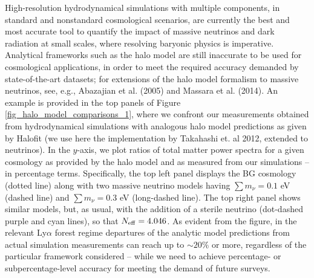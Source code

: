 \documentclass{emulateapj}
\begin{document}
High-resolution hydrodynamical simulations with multiple components,  in standard and nonstandard cosmological scenarios,  
are currently  the best and most accurate tool to quantify the impact of massive neutrinos and dark radiation at small scales, where
resolving baryonic physics is imperative. Analytical frameworks such as the halo model  are still
 inaccurate to be used for cosmological applications, in order to meet
the required accuracy demanded by state-of-the-art datasets; for extensions of the halo model formalism to massive neutrinos, see, e.g., Abazajian et al. (2005) and Massara et al. (2014). 
An example is provided in the top panels of Figure \ref{fig_halo_model_comparisons_1},
where we confront our measurements obtained from hydrodynamical simulations with
analogous halo model predictions as given by Halofit (we use here the implementation by Takahashi et. al 2012, extended to neutrinos).
In the $y$-axis, we  plot ratios of total matter power spectra for a given cosmology as provided by the halo model 
and as measured from our simulations -- in percentage terms.
Specifically, the top left panel displays the BG cosmology (dotted line) along with two massive neutrino models
having $\sum m_{\nu} = 0.1$ eV (dashed line) and $\sum m_{\nu} = 0.3$ eV (long-dashed line). 
The top right panel shows similar models, but, as usual, with the addition of a sterile neutrino (dot-dashed purple and cyan lines),
so that $N_{\rm eff} = 4.046$. As evident from the figure, 
 in the relevant Ly$\alpha$ forest regime departures of the analytic model predictions from actual simulation measurements
 can reach up to $\sim 20\%$ or more, regardless of the particular framework considered -- while we need to achieve percentage- or subpercentage-level accuracy for meeting the demand of 
 future surveys.  
\end{document}
